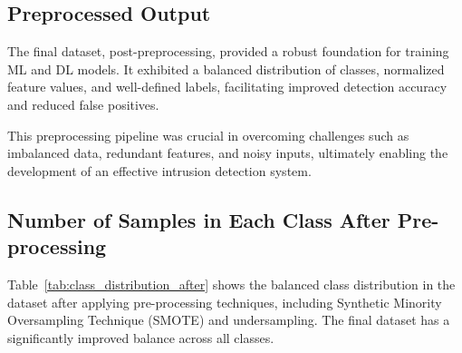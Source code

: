 \documentclass[conference]{IEEEtran}
\begin{document}
\subsection{Preprocessed Output}
The final dataset, post-preprocessing, provided a robust foundation for training ML and DL models. It exhibited a balanced distribution of classes, normalized feature values, and well-defined labels, facilitating improved detection accuracy and reduced false positives.

This preprocessing pipeline was crucial in overcoming challenges such as imbalanced data, redundant features, and noisy inputs, ultimately enabling the development of an effective intrusion detection system.

\subsection{Number of Samples in Each Class After Pre-processing}
Table~\ref{tab:class_distribution_after} shows the balanced class distribution in the dataset after applying pre-processing techniques, including Synthetic Minority Oversampling Technique (SMOTE) and undersampling. The final dataset has a significantly improved balance across all classes.
\end{document}
